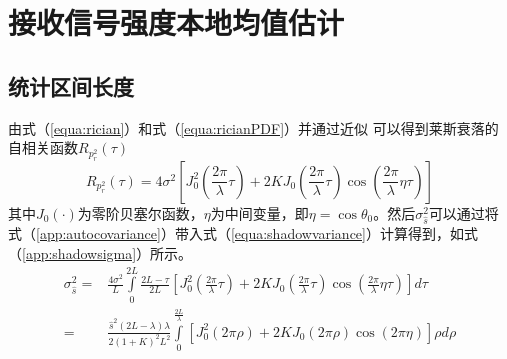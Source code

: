 
\chapter{接收信号强度本地均值估计}
\label{appchap:meanestimation}

\section{统计区间长度}
\label{appsec:lengthestimation}

由式（\ref{equa:rician}）和式（\ref{equa:ricianPDF}）并通过近似 \cite{Austin1994} 可以得到莱斯衰落的自相关函数$R_{p_{r}^2}(\tau)$
\begin{equation}
    R_{p_{r}^2}(\tau)=4\sigma^2\left[J_0^2\left(\frac{2\pi}{\lambda}\tau\right)+2KJ_0\left(\frac{2\pi}{\lambda}\tau\right)\cos\left(\frac{2\pi}{\lambda}\eta\tau\right)\right]
\label{app:autocovariance}
\end{equation}
其中$J_0(\cdot)$为零阶贝塞尔函数，$\eta$为中间变量，即$\eta=\cos\theta_0$。然后$\sigma_{\hat{s}}^2$可以通过将式（\ref{app:autocovariance}）带入式（\ref{equa:shadowvariance}）计算得到，如式（\ref{app:shadowsigma}）所示。
\begin{equation}
\begin{split}
\sigma_{\hat{s}}^{2}=&\frac{4\sigma^2}{L}\int\limits_{0}^{2L}\frac{2L-\tau}{2L}[J_0^2(\frac{2\pi}{\lambda}\tau)+2KJ_0(\frac{2\pi}{\lambda}\tau)\cos(\frac{2\pi}{\lambda}\eta\tau)]d\tau\\
=&\frac{\hat{s}^2(2L-\lambda)\lambda}{2(1+K)^{2}L^2}\int\limits_0^{\frac{2L}{\lambda}}[J_0^2(2\pi \rho)+2KJ_0(2\pi \rho)\cos(2\pi \eta)]\rho d\rho
\end{split}
\label{app:shadowsigma}
\end{equation}

